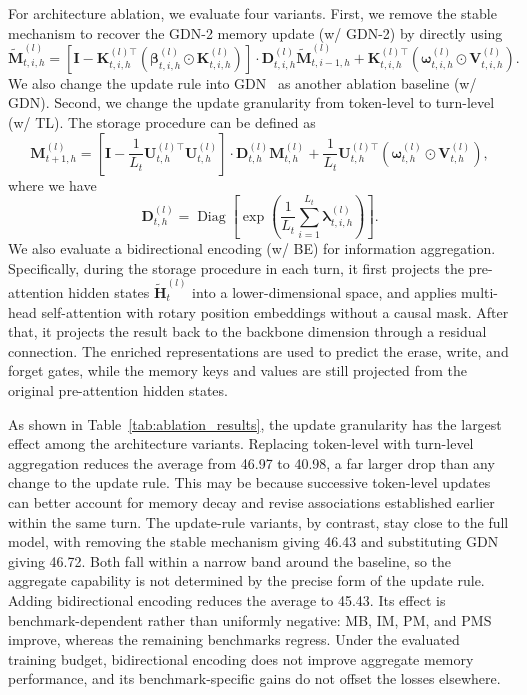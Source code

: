 For architecture ablation, we evaluate four variants.
First, we remove the stable mechanism to recover the GDN-2 memory update (w/ GDN-2) by directly using
\begin{equation*}
    \tilde{\mathbf{M}}_{t, i, h}^{(l)} = \left[
\mathbf{I}
-
\mathbf{K}_{t,i,h}^{(l)\top}
\left(
\bm{\beta}_{t,i,h}^{(l)}
\odot
\mathbf{K}_{t,i,h}^{(l)}
\right)
\right]
\cdot
\mathbf{D}_{t,i,h}^{(l)}
\tilde{\mathbf{M}}_{t,i-1,h}^{(l)}
+
\mathbf{K}_{t,i,h}^{(l)\top}
\left(
\bm{\omega}_{t,i,h}^{(l)}
\odot
\mathbf{V}_{t,i,h}^{(l)}
\right).
\end{equation*}
We also change the update rule into GDN~\cite{yang2025gateddeltanetworksimproving} as another ablation baseline (w/ GDN).
Second, we change the update granularity from token-level to turn-level (w/ TL).
The storage procedure can be defined as
\begin{equation*}
    \mathbf{M}_{t+1,h}^{(l)} = \left[
\mathbf{I}
-
\frac{1}{L_t}
\mathbf{U}_{t,h}^{(l)\top}
\mathbf{U}_{t,h}^{(l)}
\right]
\cdot
\mathbf{D}_{t,h}^{(l)}
\mathbf{M}_{t,h}^{(l)}
+
\frac{1}{L_t}
\mathbf{U}_{t,h}^{(l)\top}
\left(
\bm{\omega}_{t,h}^{(l)}
\odot
\mathbf{V}_{t,h}^{(l)}
\right),
\end{equation*}
where we have 
\begin{equation*}
    \mathbf{D}_{t,h}^{(l)} = \operatorname{Diag}
\left[
\exp
\left(
\frac{1}{L_t}
\sum_{i=1}^{L_t}
\bm{\lambda}_{t,i,h}^{(l)}
\right)
\right].
\end{equation*}
We also evaluate a bidirectional encoding (w/ BE) for information aggregation.
Specifically, during the storage procedure in each turn, it first projects the pre-attention hidden states $\tilde{\mathbf{H}}_t^{(l)}$ into a lower-dimensional space, and applies multi-head self-attention with rotary position embeddings without a causal mask.
After that, it projects the result back to the backbone dimension through a residual connection.
The enriched representations are used to predict the erase, write, and forget gates, while the memory keys and values are still projected from the original pre-attention hidden states.

As shown in Table~\ref{tab:ablation_results}, the update granularity has the largest effect among the architecture variants.
Replacing token-level with turn-level aggregation reduces the average from 46.97 to 40.98, a far larger drop than any change to the update rule.
This may be because successive token-level updates can better account for memory decay and revise associations established earlier within the same turn.
The update-rule variants, by contrast, stay close to the full model, with removing the stable mechanism giving 46.43 and substituting GDN giving 46.72.
Both fall within a narrow band around the baseline, so the aggregate capability is not determined by the precise form of the update rule.
Adding bidirectional encoding reduces the average to 45.43.
Its effect is benchmark-dependent rather than uniformly negative: MB, IM, PM, and PMS improve, whereas the remaining benchmarks regress.
Under the evaluated training budget, bidirectional encoding does not improve aggregate memory performance, and its benchmark-specific gains do not offset the losses elsewhere.

